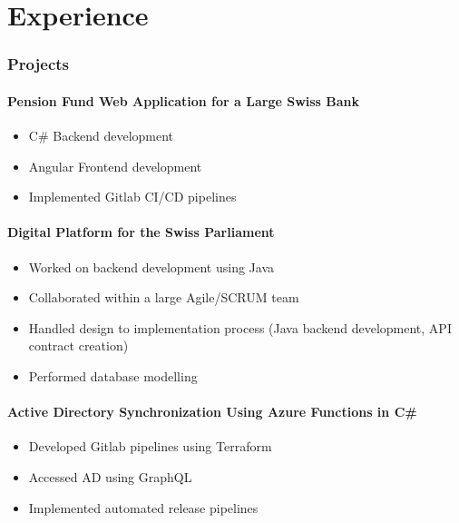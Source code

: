 \section{Experience}
\subsubsection*{Projects}
\paragraph{Pension Fund Web Application for a Large Swiss Bank}
\begin{itemize}
    \item C\# Backend development
    \item Angular Frontend development
    \item Implemented Gitlab CI/CD pipelines
\end{itemize}

\paragraph{Digital Platform for the Swiss Parliament}
\begin{itemize}
    \item Worked on backend development using Java
    \item Collaborated within a large Agile/SCRUM team
    \item Handled design to implementation process (Java backend development, API contract creation)
    \item Performed database modelling
\end{itemize}

\paragraph{Active Directory Synchronization Using Azure Functions in C\#}
\begin{itemize}
    \item Developed Gitlab pipelines using Terraform
    \item Accessed AD using GraphQL
    \item Implemented automated release pipelines
\end{itemize}
